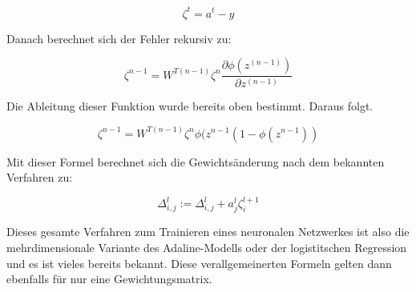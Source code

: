 \documentclass[11pt]{article} %
\begin{document}
\begin{equation}
\zeta^t = a^{t}-y 
\end{equation}
 
Danach berechnet sich der Fehler rekursiv zu:

\begin{equation}
\zeta^{n-1} = W^{T (n-1)} \zeta^{n} \frac{\partial \phi(z^{(n-1)})}{\partial z^{(n-1)}}
\end{equation}

Die Ableitung dieser Funktion wurde bereits oben bestimmt. Daraus folgt.

\begin{equation}
\zeta^{n-1} = W^{T (n-1)} \zeta^{n} \phi(z^{n-1} (1-\phi(z^{n-1}))
\end{equation}

Mit dieser Formel berechnet sich die Gewichtsänderung nach dem bekannten Verfahren zu:

\begin{equation}
\Delta^l_{i, j} := \Delta^l_{i, j} + a^l_{j} \zeta^{l+1}_i  
\end{equation}

Dieses gesamte Verfahren zum Trainieren eines neuronalen Netzwerkes ist also die mehrdimensionale Variante des Adaline-Modells oder der logistitschen Regression und es ist vieles bereits bekannt. Diese verallgemeinerten Formeln gelten dann ebenfalls für nur eine Gewichtungsmatrix. 
\end{document}
